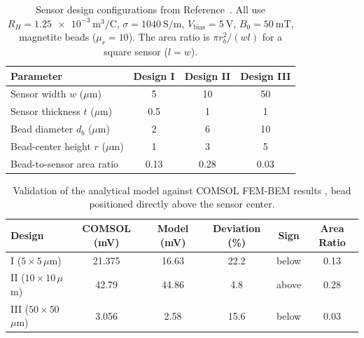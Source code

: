 \documentclass[micromachines,article,submit,pdftex,moreauthors]{Definitions/mdpi}
\begin{document}
\begin{table}[H]
\caption{Sensor design configurations from Reference~\cite{govindaraju2025}. All use
$R_H = \SI{1.25e-3}{\meter\cubed\per\coulomb}$,
$\sigma = \SI{1040}{\siemens\per\meter}$, $V_{\text{bias}} = \SI{5}{\volt}$,
$B_0 = \SI{50}{\milli\tesla}$, magnetite beads ($\mu_r = 10$). The area ratio is
$\pi r_b^2 / (w l)$ for a square sensor ($l = w$).\label{tab:designs}}
\begin{tabularx}{\textwidth}{Xccc}
\toprule
\textbf{Parameter} & \textbf{Design I} & \textbf{Design II} & \textbf{Design III} \\
\midrule
Sensor width $w$ ($\mu$m)         & 5    & 10   & 50 \\
Sensor thickness $t$ ($\mu$m)     & 0.5  & 1    & 1 \\
Bead diameter $d_b$ ($\mu$m)      & 2    & 6    & 10 \\
Bead-center height $r$ ($\mu$m)   & 1    & 3    & 5 \\
Bead-to-sensor area ratio         & 0.13 & 0.28 & 0.03 \\
\bottomrule
\end{tabularx}
\end{table}

\begin{table}[H]
\caption{Validation of the analytical model against COMSOL FEM-BEM results
\cite{govindaraju2025}, bead positioned directly above the sensor center.
\label{tab:validation}}
\begin{tabularx}{\textwidth}{Xccccc}
\toprule
\textbf{Design} & \textbf{COMSOL (mV)} & \textbf{Model (mV)} &
\textbf{Deviation (\%)} & \textbf{Sign} & \textbf{Area Ratio} \\
\midrule
I ($5\times5$\,$\mu$m)   & 21.375 & 16.63 & 22.2 & below & 0.13 \\
II ($10\times10$\,$\mu$m) & 42.79  & 44.86 & 4.8  & above & 0.28 \\
III ($50\times50$\,$\mu$m) & 3.056  & 2.58  & 15.6 & below & 0.03 \\
\bottomrule
\end{tabularx}
\end{table}
\end{document}
